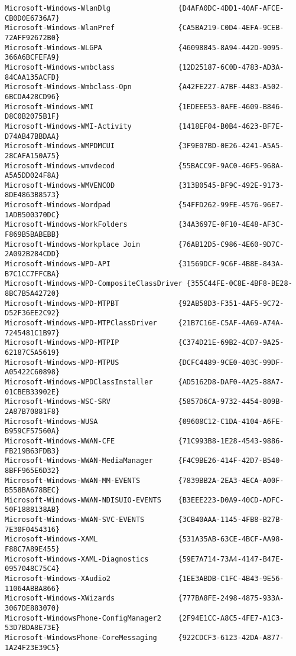 \documentclass{report}
\begin{document}
\begin{lstlisting}[breaklines=true,basicstyle=\tiny]
Microsoft-Windows-WlanDlg                {D4AFA0DC-4DD1-40AF-AFCE-CB0D0E6736A7}
Microsoft-Windows-WlanPref               {CA5BA219-C0D4-4EFA-9CEB-72AFF92672B0}
Microsoft-Windows-WLGPA                  {46098845-8A94-442D-9095-366A6BCFEFA9}
Microsoft-Windows-wmbclass               {12D25187-6C0D-4783-AD3A-84CAA135ACFD}
Microsoft-Windows-Wmbclass-Opn           {A42FE227-A7BF-4483-A502-6BCDA428CD96}
Microsoft-Windows-WMI                    {1EDEEE53-0AFE-4609-B846-D8C0B2075B1F}
Microsoft-Windows-WMI-Activity           {1418EF04-B0B4-4623-BF7E-D74AB47BBDAA}
Microsoft-Windows-WMPDMCUI               {3F9E07BD-0E26-4241-A5A5-28CAFA150A75}
Microsoft-Windows-wmvdecod               {55BACC9F-9AC0-46F5-968A-A5A5DD024F8A}
Microsoft-Windows-WMVENCOD               {313B0545-BF9C-492E-9173-8DE4863B8573}
Microsoft-Windows-Wordpad                {54FFD262-99FE-4576-96E7-1ADB500370DC}
Microsoft-Windows-WorkFolders            {34A3697E-0F10-4E48-AF3C-F869B5BABEBB}
Microsoft-Windows-Workplace Join         {76AB12D5-C986-4E60-9D7C-2A092B284CDD}
Microsoft-Windows-WPD-API                {31569DCF-9C6F-4B8E-843A-B7C1CC7FFCBA}
Microsoft-Windows-WPD-CompositeClassDriver {355C44FE-0C8E-4BF8-BE28-8BC7B5A42720}
Microsoft-Windows-WPD-MTPBT              {92AB58D3-F351-4AF5-9C72-D52F36EE2C92}
Microsoft-Windows-WPD-MTPClassDriver     {21B7C16E-C5AF-4A69-A74A-7245481C1B97}
Microsoft-Windows-WPD-MTPIP              {C374D21E-69B2-4CD7-9A25-62187C5A5619}
Microsoft-Windows-WPD-MTPUS              {DCFC4489-9CE0-403C-99DF-A05422C60898}
Microsoft-Windows-WPDClassInstaller      {AD5162D8-DAF0-4A25-88A7-01CBEB33902E}
Microsoft-Windows-WSC-SRV                {5857D6CA-9732-4454-809B-2A87B70881F8}
Microsoft-Windows-WUSA                   {09608C12-C1DA-4104-A6FE-B959CF57560A}
Microsoft-Windows-WWAN-CFE               {71C993B8-1E28-4543-9886-FB219B63FDB3}
Microsoft-Windows-WWAN-MediaManager      {F4C9BE26-414F-42D7-B540-8BFF965E6D32}
Microsoft-Windows-WWAN-MM-EVENTS         {7839BB2A-2EA3-4ECA-A00F-B558BA678BEC}
Microsoft-Windows-WWAN-NDISUIO-EVENTS    {B3EEE223-D0A9-40CD-ADFC-50F1888138AB}
Microsoft-Windows-WWAN-SVC-EVENTS        {3CB40AAA-1145-4FB8-B27B-7E30F0454316}
Microsoft-Windows-XAML                   {531A35AB-63CE-4BCF-AA98-F88C7A89E455}
Microsoft-Windows-XAML-Diagnostics       {59E7A714-73A4-4147-B47E-0957048C75C4}
Microsoft-Windows-XAudio2                {1EE3ABDB-C1FC-4B43-9E56-11064ABBA866}
Microsoft-Windows-XWizards               {777BA8FE-2498-4875-933A-3067DE883070}
Microsoft-WindowsPhone-ConfigManager2    {2F94E1CC-A8C5-4FE7-A1C3-53D7BDA8E73E}
Microsoft-WindowsPhone-CoreMessaging     {922CDCF3-6123-42DA-A877-1A24F23E39C5}

\end{lstlisting}
\end{document}
